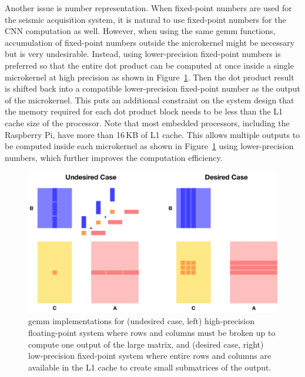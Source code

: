 \documentclass{article}
\begin{document}
Another issue is number representation.
When fixed-point numbers are used for the seismic acquisition system, it is natural to use fixed-point numbers for the CNN computation as well. 
However, when using the same \gls{gemm} functions, accumulation of fixed-point numbers outside the microkernel might be necessary but is very undesirable.
Instead, using lower-precision fixed-point numbers is preferred so that the entire dot product can be computed at once inside a single microkernel at high precision as shown in Figure~\ref{fig:hardware_implmentation}.
Then the dot product result is shifted back into a compatible lower-precision fixed-point number as the output of the microkernel.
This puts an additional constraint on the system design that the memory required for each dot product block needs to be less than the L1 cache size of the processor.
Note that most embedded processors, including the Raspberry Pi, have more than 16\,KB of L1 cache.
This allows multiple outputs to be computed inside each microkernel as shown in Figure~\ref{fig:hardware_implmentation} using lower-precision numbers, which further improves the computation efficiency.
%
\begin{figure}
    \centering
    \includegraphics[width=\linewidth]{hardware_implementation}
    \caption{\gls{gemm} implementations for (undesired case, left) high-precision floating-point system where rows and columns must be broken up to compute one output of the large matrix, and (desired case, right) low-precision fixed-point system where entire rows and columns are available in the L1 cache to create small submatrices of the output.}
    \label{fig:hardware_implmentation}
\end{figure}
%
\end{document}

